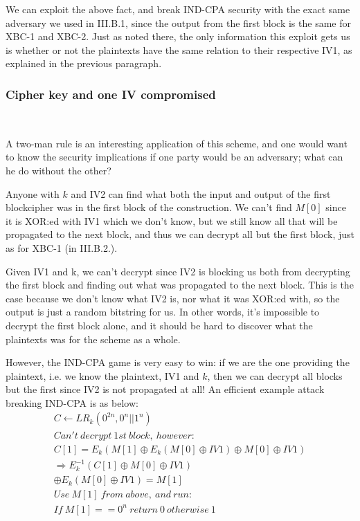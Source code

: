 \documentclass[conference]{IEEEtran}
\begin{document}
We can exploit the above fact, and break IND-CPA security with the exact same adversary we used in III.B.1, since the output from the first block is the same for XBC-1 and XBC-2. Just as noted there, the only information this exploit gets us is whether or not the plaintexts have the same relation to their respective IV1, as explained in the previous paragraph.

\subsubsection{Cipher key and one IV compromised} \

A two-man rule is an interesting application of this scheme, and one would want to know the security implications if one party would be an adversary; what can he do without the other? \

Anyone with $k$ and IV2 can find what both the input and output of the first blockcipher was in the first block of the construction. We can't find $M[0]$ since it is XOR:ed with IV1 which we don't know, but we still know all that will be propagated to the next block, and thus we can decrypt all but the first block, just as for XBC-1 (in III.B.2.). \

Given IV1 and k, we can't decrypt since IV2 is blocking us both from decrypting the first block and finding out what was propagated to the next block. This is the case because we don't know what IV2 is, nor what it was XOR:ed with, so the output is just a random bitstring for us. In other words, it's impossible to decrypt the first block alone, and it should be hard to discover what the plaintexts was for the scheme as a whole. \

However, the IND-CPA game is very easy to win: if we are the one providing the plaintext, i.e. we know the plaintext, IV1 and $k$, then we can decrypt all blocks but the first since IV2 is not propagated at all! An efficient example attack breaking IND-CPA is as below:
\begin{gather*}
  C \leftarrow LR_k(0^{2n},0^n || 1^n) \\
  Can't\ decrypt\ 1st\ block,\ however: \\
  C[1] = E_k(M[1] \oplus E_k(M[0] \oplus IV1) \oplus M[0] \oplus IV1) \\
  \Rightarrow E_k^{-1}(C[1] \oplus M[0] \oplus IV1) \\
  \oplus E_k(M[0] \oplus IV1) = M[1] \\
  Use\ M[1]\ from\ above,\ and\ run: \\
  If\ M[1]==0^n\ return\ 0\ otherwise\ 1
\end{gather*}
\end{document}
